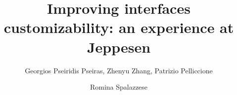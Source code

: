 \documentclass[final,5p,times,twocolumn]{elsarticle}
\begin{document}
\title{Improving interfaces customizability: an experience at Jeppesen} %

\author[CTH]{Georgios Pseiridis Pseiras, Zhenyu Zhang, Patrizio Pelliccione}

\author[MAL]{Romina Spalazzese}


\address[CTH]{Chalmers University of Technology | University of Gothenburg\\
Department of Computer Science and Engineering,
Gothenburg, Sweden}   



% 
\end{document}
